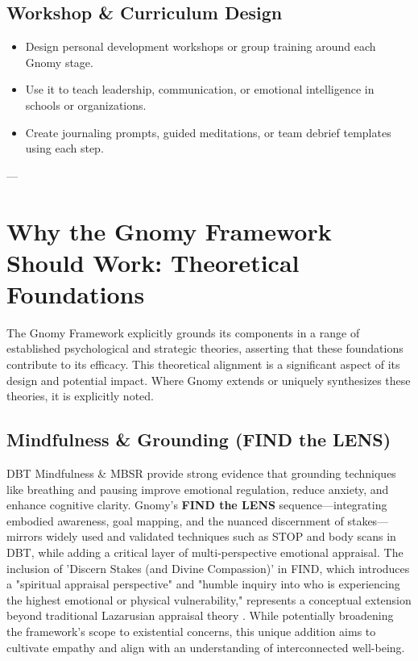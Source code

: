 \documentclass{article}
\begin{document}
\subsection{Workshop \& Curriculum Design}
\begin{itemize}[noitemsep,topsep=0pt]
    \item Design personal development workshops or group training around each Gnomy stage.
    \item Use it to teach leadership, communication, or emotional intelligence in schools or organizations.
    \item Create journaling prompts, guided meditations, or team debrief templates using each step.
\end{itemize}

---

\section{Why the Gnomy Framework Should Work: Theoretical Foundations}
The Gnomy Framework explicitly grounds its components in a range of established psychological and strategic theories, asserting that these foundations contribute to its efficacy. This theoretical alignment is a significant aspect of its design and potential impact. Where Gnomy extends or uniquely synthesizes these theories, it is explicitly noted.

\subsection{Mindfulness \& Grounding (FIND the LENS)}
DBT Mindfulness \cite{linehan1993cognitive} \& MBSR \cite{kabat1990full} provide strong evidence that grounding techniques like breathing and pausing improve emotional regulation, reduce anxiety, and enhance cognitive clarity. Gnomy’s \textbf{FIND the LENS} sequence—integrating embodied awareness, goal mapping, and the nuanced discernment of stakes—mirrors widely used and validated techniques such as STOP and body scans in DBT, while adding a critical layer of multi-perspective emotional appraisal. The inclusion of 'Discern Stakes (and Divine Compassion)' in FIND, which introduces a "spiritual appraisal perspective" and "humble inquiry into who is experiencing the highest emotional or physical vulnerability," represents a conceptual extension beyond traditional Lazarusian appraisal theory \cite{lazarus1984stress}. While potentially broadening the framework's scope to existential concerns, this unique addition aims to cultivate empathy and align with an understanding of interconnected well-being.
\end{document}
